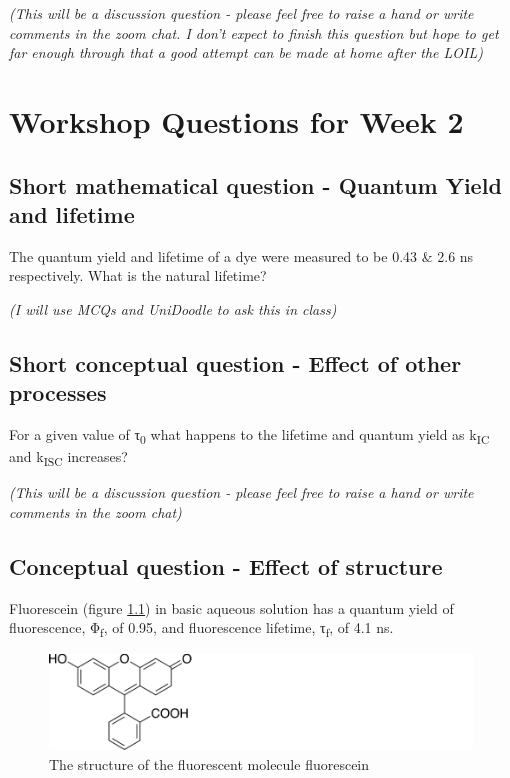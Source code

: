\documentclass[
]{book}
\begin{document}
\emph{(This will be a discussion question - please feel free to raise a hand or write comments in the zoom chat. I don't expect to finish this question but hope to get far enough through that a good attempt can be made at home after the LOIL)}

\hypertarget{ch:Workshop2}{%
\chapter{Workshop Questions for Week 2}\label{ch:Workshop2}}

\hypertarget{sec:YieldLifetime}{%
\section{Short mathematical question - Quantum Yield and lifetime}\label{sec:YieldLifetime}}

The quantum yield and lifetime of a dye were measured to be 0.43 \& 2.6 ns respectively. What is the natural lifetime?

\emph{(I will use MCQs and UniDoodle to ask this in class)}

\hypertarget{sec:otherprocesses}{%
\section{Short conceptual question - Effect of other processes}\label{sec:otherprocesses}}

For a given value of τ\textsubscript{0} what happens to the lifetime and quantum yield as k\textsubscript{IC} and k\textsubscript{ISC} increases?

\emph{(This will be a discussion question - please feel free to raise a hand or write comments in the zoom chat)}

\hypertarget{sec:structure}{%
\section{Conceptual question - Effect of structure}\label{sec:structure}}

Fluorescein (figure \ref{fig:fluorescein}) in basic aqueous solution has a quantum yield of fluorescence, Φ\textsubscript{f}, of 0.95, and fluorescence lifetime, τ\textsubscript{f}, of 4.1 ns.

\begin{figure}

{\centering \includegraphics[width=0.7\linewidth]{images/fluorescein} 

}

\caption{The structure of the fluorescent molecule fluorescein}\label{fig:fluorescein}
\end{figure}
\end{document}
